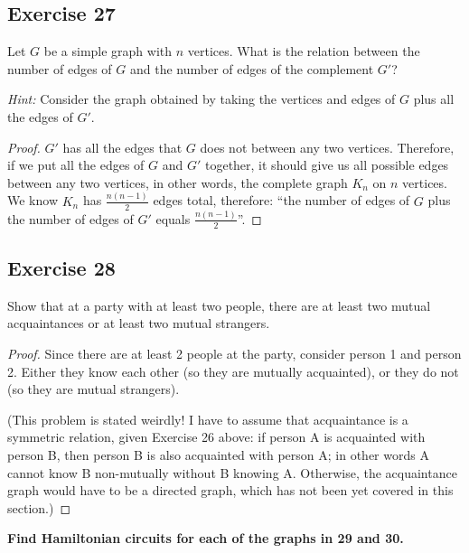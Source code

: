 \documentclass[14pt]{extarticle}
\newcommand{\cy}{\color{cyan}}
\begin{document}
\subsection{Exercise 27}
Let \(G\) be a simple graph with \(n\) vertices. What is the relation between the number of edges of \(G\) and the number 
of edges of the complement \(G'\)?

{\it Hint:} Consider the graph obtained by taking the vertices and edges of \(G\) plus all the edges of \(G'\).

\begin{proof}
\(G'\) has all the edges that \(G\) does not between any two vertices. Therefore, if we put all the edges of \(G\) and 
\(G'\) together, it should give us all possible edges between any two vertices, in other words, the complete graph \(K_n\) 
on \(n\) vertices. We know \(K_n\) has \(\frac{n(n-1)}{2}\) edges total, therefore: ``the number of edges of \(G\) plus 
the number of edges of \(G'\) equals \(\frac{n(n-1)}{2}\)''.
\end{proof}

\subsection{Exercise 28}
Show that at a party with at least two people, there are at least two mutual acquaintances or at least two mutual 
strangers.

\begin{proof}
Since there are at least 2 people at the party, consider person 1 and person 2. Either they know each other (so they 
are mutually acquainted), or they do not (so they are mutual strangers).

(This problem is stated weirdly! I have to assume that acquaintance is a symmetric relation, given Exercise 26 above: 
if person A is acquainted with person B, then person B is also acquainted with person A; in other words A cannot know B 
non-mutually without B knowing A. Otherwise, the acquaintance graph would have to be a directed graph, which has not been 
yet covered in this section.)
\end{proof}

{\bf \cy Find Hamiltonian circuits for each of the graphs in 29 and 30.}
\end{document}
